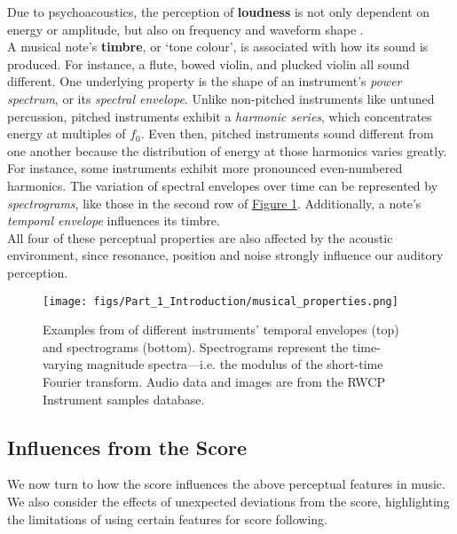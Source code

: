 Due to psychoacoustics, the perception of \textbf{loudness} is not only dependent on energy or amplitude, but also on frequency and waveform shape \cite{donnelly_2015_learning}. \\

A musical note's \textbf{timbre}, or `tone colour', is associated with how its sound is produced. For instance, a flute, bowed violin, and plucked violin all sound different. One underlying property is the shape of an instrument's \textit{power spectrum}, or its \textit{spectral envelope}. Unlike non-pitched instruments like untuned percussion, pitched instruments exhibit a \textit{harmonic series}, which concentrates energy at multiples of $f_0$. Even then, pitched instruments sound different from one another because the distribution of energy at those harmonics varies greatly. For instance, some instruments exhibit more pronounced even-numbered harmonics. The variation of spectral envelopes over time can be represented by \textit{spectrograms}, like those in the second row of \hyperref[fig:musical_properties]{Figure \ref*{fig:musical_properties}}. Additionally, a note's \textit{temporal envelope} influences its timbre.  \\

All four of these perceptual properties are also affected by the acoustic environment, since resonance, position and noise strongly influence our auditory perception. \\

\begin{figure}[H]
    \centering
    \texttt{[image: figs/Part\_1\_Introduction/musical\_properties.png]}
    \caption{Examples from \cite{godsill_2006_bayesian} of different instruments' temporal envelopes (top) and spectrograms (bottom). Spectrograms represent the time-varying magnitude spectra—i.e. the modulus of the short-time Fourier transform. Audio data and images are from the RWCP Instrument samples database.}
    \label{fig:musical_properties}
\end{figure}

\subsection{Influences from the Score}{\label{subsection:score_influences}}
We now turn to how the score influences the above perceptual features in music. We also consider the effects of unexpected deviations from the score, highlighting the limitations of using certain features for score following. \\

